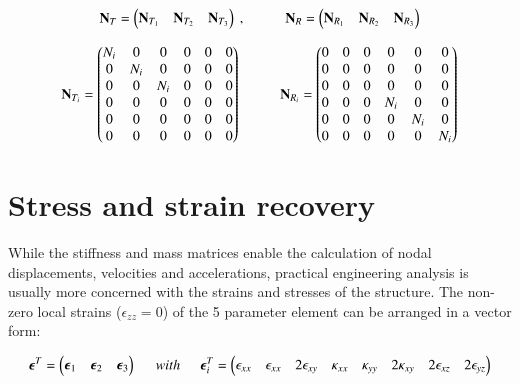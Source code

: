\begin{equation} 
\mathbf{N}_T = 
\begin{pmatrix}
\mathbf{N}_{T_1} & \mathbf{N}_{T_2} & \mathbf{N}_{T_3}
\end{pmatrix}\ ,
\hspace{10mm}
\mathbf{N}_R = 
\begin{pmatrix}
\mathbf{N}_{R_1} & \mathbf{N}_{R_2} & \mathbf{N}_{R_3}
\end{pmatrix}
\label{eqt17_8}
\end{equation}

\begin{equation} 
\mathbf{N}_{T_i} = 
\begin{pmatrix}
N_i & 0 & 0 & 0 & 0 & 0 \\
0 & N_i & 0 & 0 & 0 & 0 \\
0 & 0 & N_i & 0 & 0 & 0 \\
0 & 0 & 0 & 0 & 0 & 0 \\
0 & 0 & 0 & 0 & 0 & 0 \\
0 & 0 & 0 & 0 & 0 & 0
\end{pmatrix}
\hspace{10mm}
\mathbf{N}_{R_i} = 
\begin{pmatrix}
0 & 0 & 0 & 0 & 0 & 0 \\
0 & 0 & 0 & 0 & 0 & 0 \\
0 & 0 & 0 & 0 & 0 & 0 \\
0 & 0 & 0 & N_i & 0 & 0 \\
0 & 0 & 0 & 0 & N_i & 0 \\
0 & 0 & 0 & 0 & 0 & N_i
\end{pmatrix}
\label{eqt17_9}
\end{equation}


\section{Stress and strain recovery}

While the stiffness and mass matrices enable the calculation of nodal displacements, velocities and accelerations, practical engineering analysis is usually more concerned with the strains and stresses of the structure. The non-zero local strains ($\epsilon_{zz} = 0$) of the 5 parameter element can be arranged in a vector form:

\begin{equation} 
\boldsymbol{\epsilon}^T = \begin{pmatrix}
\boldsymbol{\epsilon}_1 & \boldsymbol{\epsilon}_2 & \boldsymbol{\epsilon}_3
\end{pmatrix}
\hspace{5mm}
with
\hspace{5mm}
\boldsymbol{\epsilon}^T_i = \begin{pmatrix}
\epsilon_{xx} & \epsilon_{xx} & 2\epsilon_{xy} & \kappa_{xx} & \kappa_{yy} & 2\kappa_{xy} & 2\epsilon_{xz} & 2\epsilon_{yz}
\end{pmatrix}
\label{eqt18}
\end{equation}

